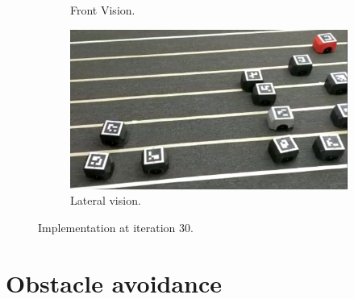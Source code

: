 \begin{appendix}
\begin{figure}[H]
\begin{subfigure}[b]{0.4\textwidth}
    \caption{Front Vision.}
    \label{fig:second}
\end{subfigure}
\hfill
\begin{subfigure}[b]{0.50\textwidth}
    \includegraphics[width=\textwidth]{Anexos/no_restricted/no_res_it30_cam2.png}
    \caption{Lateral vision.}
    \label{fig:third}
\end{subfigure}
\caption{Implementation at iteration 30.}
\label{fig:figures}
\end{figure}
\section{Obstacle avoidance}


\end{appendix}
